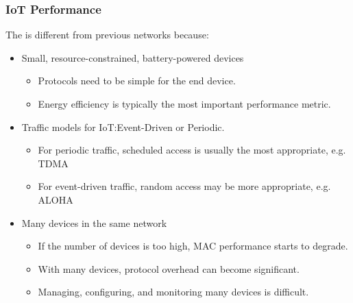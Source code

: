 \subsubsection{IoT Performance}\label{subsubsec:IoT_Performance}
The  is different from previous networks because:
\begin{itemize}[noitemsep]
\item Small, resource-constrained, battery-powered devices
  \begin{itemize}[noitemsep]
  \item Protocols need to be simple for the end device.
  \item Energy efficiency is typically the most important performance metric.
  \end{itemize}

\item Traffic models for IoT:\@ Event-Driven or Periodic.
  \begin{itemize}[noitemsep]
  \item For periodic traffic, scheduled access is usually the most appropriate, e.g. TDMA
  \item For event-driven traffic, random access may be more appropriate, e.g. ALOHA
  \end{itemize}

\item Many devices in the same network
  \begin{itemize}[noitemsep]
  \item If the number of devices is too high, MAC performance starts to degrade.
  \item With many devices, protocol overhead can become significant.
  \item Managing, configuring, and monitoring many devices is difficult.
  \end{itemize}
\end{itemize}

